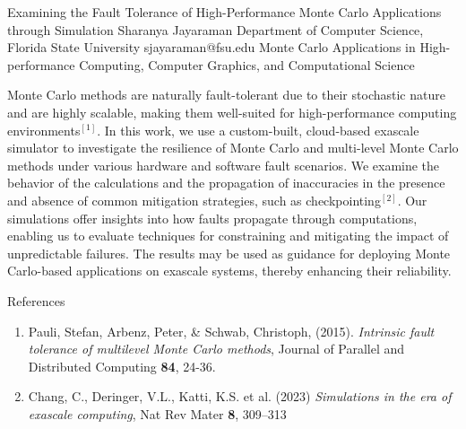 \begin{talk}
  {Examining the Fault Tolerance of High-Performance Monte Carlo Applications through Simulation}%
  {Sharanya Jayaraman}%
  {Department of Computer Science, Florida State University}%
  {sjayaraman@fsu.edu}%
  {}%
  {Monte Carlo Applications in High-performance Computing, Computer Graphics, and Computational Science}%
   
Monte Carlo methods are naturally fault-tolerant due to their stochastic nature and are highly scalable, making them well-suited for high-performance computing environments$^{[1]}$. In this work, we use a custom-built, cloud-based exascale simulator to investigate the resilience of Monte Carlo and multi-level Monte Carlo methods under various hardware and software fault scenarios. We examine the behavior of the calculations and the propagation of inaccuracies in the presence and absence of common mitigation strategies, such as checkpointing$^{[2]}$. Our simulations offer insights into how faults propagate through computations, enabling us to evaluate techniques for constraining and mitigating the impact of unpredictable failures. The results may be used as guidance for deploying Monte Carlo-based applications on exascale systems, thereby enhancing their reliability.

\medskip

References
\begin{enumerate}
 \item[{[1]}] Pauli, Stefan, Arbenz, Peter, \&  Schwab, Christoph, (2015). {\it Intrinsic fault tolerance of multilevel Monte Carlo methods}, Journal of Parallel and Distributed Computing \textbf{84}, 24-36.
 \item[{[2]}] Chang, C., Deringer, V.L., Katti, K.S. et al. (2023) {\it Simulations in the era of exascale computing}, Nat Rev Mater \textbf{8}, 309--313 
\end{enumerate}

\end{talk}

